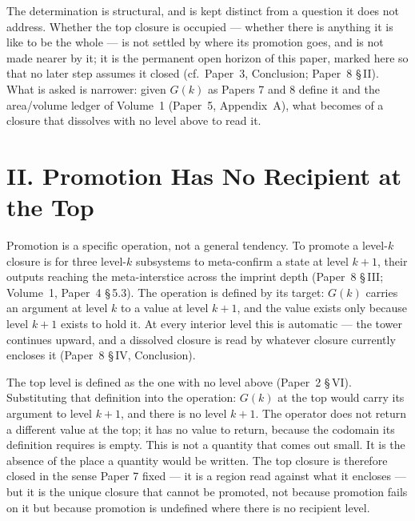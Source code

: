 \documentclass[11pt,oneside]{report}
\theoremstyle{definition}
\theoremstyle{remark}
\begin{document}
The determination is structural, and is kept distinct from a question it does not
address. Whether the top closure is occupied --- whether there is anything it is like
to be the whole --- is not settled by where its promotion goes, and is not made nearer
by it; it is the permanent open horizon of this paper, marked here so that no later
step assumes it closed (cf.\ Paper~3, Conclusion; Paper~8 \S\,II). What is asked is
narrower: given \ensuremath{G(k)} as Papers 7 and 8 define it and the area/volume
ledger of Volume~1 (Paper~5, Appendix~A), what becomes of a closure that dissolves
with no level above to read it.

\section*{II. Promotion Has No Recipient at the Top}

Promotion is a specific operation, not a general tendency. To promote a level-\ensuremath{k}
closure is for three level-\ensuremath{k} subsystems to meta-confirm a state at level
\ensuremath{k{+}1}, their outputs reaching the meta-interstice across the imprint depth
(Paper~8 \S\,III; Volume~1, Paper~4 \S\,5.3). The operation is defined by its target:
\ensuremath{G(k)} carries an argument at level \ensuremath{k} to a value at level
\ensuremath{k{+}1}, and the value exists only because level \ensuremath{k{+}1} exists to hold
it. At every interior level this is automatic --- the tower continues upward, and a dissolved
closure is read by whatever closure currently encloses it (Paper~8 \S\,IV, Conclusion).

The top level is defined as the one with no level above (Paper~2 \S\,VI). Substituting that
definition into the operation: \ensuremath{G(k)} at the top would carry its argument to level
\ensuremath{k{+}1}, and there is no level \ensuremath{k{+}1}. The operator does not return a
different value at the top; it has no value to return, because the codomain its definition
requires is empty. This is not a quantity that comes out small. It is the absence of the place a
quantity would be written. The top closure is therefore closed in the sense Paper 7 fixed --- it
is a region read against what it encloses --- but it is the unique closure that cannot be
promoted, not because promotion fails on it but because promotion is undefined where there is no
recipient level.
\end{document}
